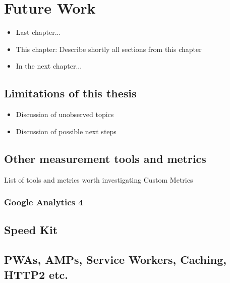 \chapter{Future Work}

\begin{itemize}
	\item Last chapter...
	\item This chapter: Describe shortly all sections from this chapter
	\item In the next chapter...
\end{itemize}





\section{Limitations of this thesis}

\begin{itemize}
\item Discussion of unobserved topics
\item Discussion of possible next steps
\end{itemize}

\section{Other measurement tools and metrics}


List of tools and metrics worth investigating
Custom Metrics


\subsection{Google Analytics 4}


\section{Speed Kit}



\section{PWAs, AMPs, Service Workers, Caching, HTTP2 etc.}

